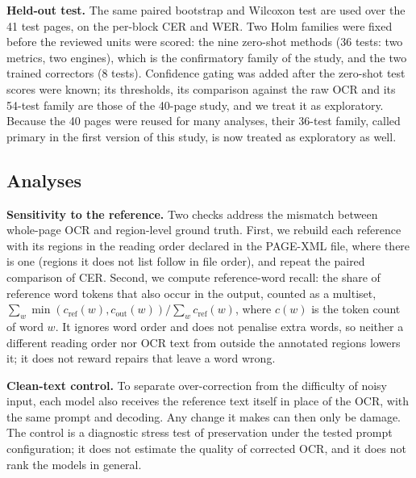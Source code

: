 \documentclass[conference]{IEEEtran}
\begin{document}
\textbf{Held-out test.} The same paired bootstrap and Wilcoxon test are used over the 41 test pages, on the per-block CER and WER. Two Holm families were fixed before the reviewed units were scored: the nine zero-shot methods (36 tests: two metrics, two engines), which is the confirmatory family of the study, and the two trained correctors (8 tests). Confidence gating was added after the zero-shot test scores were known; its thresholds, its comparison against the raw OCR and its 54-test family are those of the 40-page study, and we treat it as exploratory. Because the 40 pages were reused for many analyses, their 36-test family, called primary in the first version of this study, is now treated as exploratory as well.

\subsection{Analyses}
\label{sec:analyses}
\textbf{Sensitivity to the reference.} Two checks address the mismatch between whole-page OCR and region-level ground truth. First, we rebuild each reference with its regions in the reading order declared in the PAGE-XML file, where there is one (regions it does not list follow in file order), and repeat the paired comparison of CER. Second, we compute reference-word recall: the share of reference word tokens that also occur in the output, counted as a multiset, $\sum_w\min(c_{\mathrm{ref}}(w),c_{\mathrm{out}}(w))/\sum_w c_{\mathrm{ref}}(w)$, where $c(w)$ is the token count of word $w$. It ignores word order and does not penalise extra words, so neither a different reading order nor OCR text from outside the annotated regions lowers it; it does not reward repairs that leave a word wrong.

\textbf{Clean-text control.} To separate over-correction from the difficulty of noisy input, each model also receives the reference text itself in place of the OCR, with the same prompt and decoding. Any change it makes can then only be damage. The control is a diagnostic stress test of preservation under the tested prompt configuration; it does not estimate the quality of corrected OCR, and it does not rank the models in general.
\end{document}
